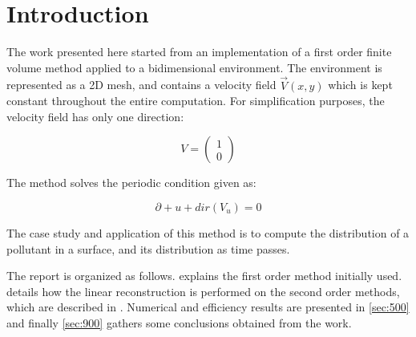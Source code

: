 \section{Introduction}
\label{sec:100}

The work presented here started from an implementation of a first order finite volume method applied to a bidimensional environment. The environment is represented as a 2D mesh, and contains a velocity field $\vec{V}(x, y)$ which is kept constant throughout the entire computation. For simplification purposes, the velocity field has only one direction:

$$V = \left( \begin{array}{c} 1 \\ 0 \end{array} \right) $$

The method solves the periodic condition given as:

$$ \partial + u + dir(V_u) = 0 $$

The case study and application of this method is to compute the distribution of a pollutant in a surface, and its distribution as time passes.

The report is organized as follows.  explains the first order method initially used.  details how the linear reconstruction is performed on the second order methods, which are described in . Numerical and efficiency results are presented in \cref{sec:500} and finally \cref{sec:900} gathers some conclusions obtained from the work.
